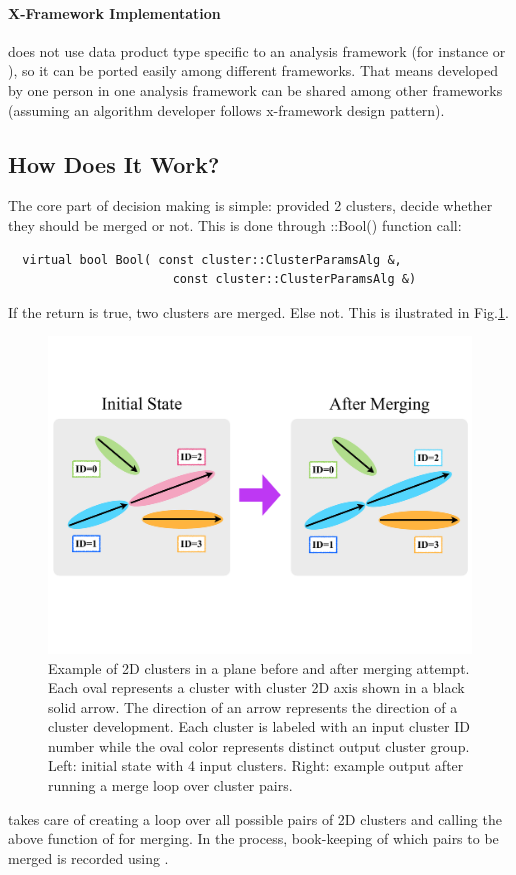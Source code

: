 \paragraph{X-Framework Implementation}
{\cmerge} does not use data product type specific to an analysis framework (for instance {\larlight} or {\larsoft}), so it can be ported easily among different frameworks. That means {\cmalgo} developed by one person in one analysis framework can be shared among other frameworks (assuming an algorithm developer follows x-framework design pattern).\\

\subsection{How Does It Work?}
\label{sec:fmwk:cmerge:how}
The core part of decision making is simple: provided 2 clusters, decide whether they should be merged or not.
This is done through {\cmalgo::Bool()} function call:
\begin{lstlisting}
  virtual bool Bool( const cluster::ClusterParamsAlg &, 
                       const cluster::ClusterParamsAlg &)
\end{lstlisting}
If the return is {\ttfamily true}, two clusters are merged. Else not.
This is ilustrated in Fig.\ref{sec:fmwk:cmerge:merge_example}.

\begin{figure}[ht]\begin{center}
\includegraphics[width=13cm]{./src/Pictures/MergeExample.pdf}
\caption{Example of 2D clusters in a plane before and after merging attempt. Each oval represents a cluster with cluster 2D axis shown in a black solid arrow. The direction of an arrow represents the direction of a cluster development. Each cluster is labeled with an input cluster ID number while the oval color represents distinct output cluster group. Left: initial state with 4 input clusters. Right: example output after running a merge loop over cluster pairs. }
\label{sec:fmwk:cmerge:merge_example}
\end{center}\end{figure}
{\cmerge} takes care of creating a loop over all possible pairs of 2D clusters and calling the above function of {\cmalgo} for merging.
In the process, book-keeping of which pairs to be merged is recorded using {\cbkeeper}.


